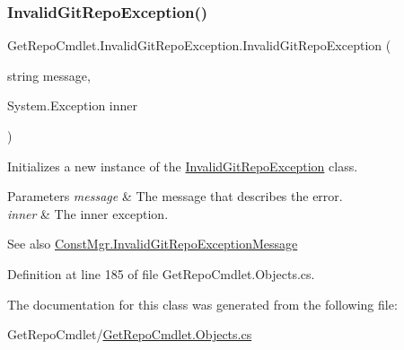 \subsubsection{\texorpdfstring{Invalid\+Git\+Repo\+Exception()}{InvalidGitRepoException()}\hspace{0.1cm}{\footnotesize\ttfamily [3/3]}}
{\footnotesize\ttfamily Get\+Repo\+Cmdlet.\+Invalid\+Git\+Repo\+Exception.\+Invalid\+Git\+Repo\+Exception (\begin{DoxyParamCaption}\item[{string}]{message,  }\item[{System.\+Exception}]{inner }\end{DoxyParamCaption})}



Initializes a new instance of the \mbox{\hyperlink{class_get_repo_cmdlet_1_1_invalid_git_repo_exception}{Invalid\+Git\+Repo\+Exception}} class. 


\begin{DoxyParams}{Parameters}
{\em message} & The message that describes the error.\\
\hline
{\em inner} & The inner exception.\\
\hline
\end{DoxyParams}
\begin{DoxySeeAlso}{See also}
\mbox{\hyperlink{class_get_repo_cmdlet_1_1_const_mgr_a84baefdb7fb1bcd31e0148b4ce532d8f}{Const\+Mgr.\+Invalid\+Git\+Repo\+Exception\+Message}}


\end{DoxySeeAlso}


Definition at line 185 of file Get\+Repo\+Cmdlet.\+Objects.\+cs.



The documentation for this class was generated from the following file\+:\begin{DoxyCompactItemize}
\item 
Get\+Repo\+Cmdlet/\mbox{\hyperlink{_get_repo_cmdlet_8_objects_8cs}{Get\+Repo\+Cmdlet.\+Objects.\+cs}}\end{DoxyCompactItemize}
